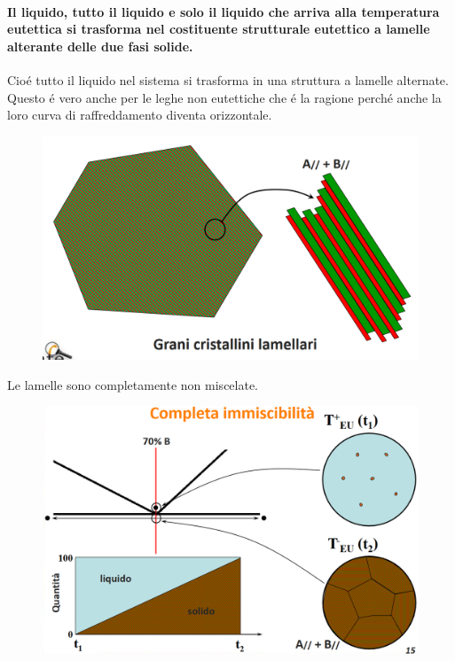 \documentclass{article}
\begin{document}
{            \paragraph{Il liquido, tutto il liquido e solo il liquido che arriva alla temperatura eutettica si trasforma nel costituente strutturale eutettico a lamelle alterante delle due fasi solide.}
            Cio\'e tutto il liquido nel sistema si trasforma in una struttura a lamelle alternate. Questo \'e vero anche per le leghe non eutettiche che \'e la ragione perch\'e anche la loro curva di raffreddamento diventa orizzontale.
            \begin{figure}[!h]
                \centering
                \includegraphics[width=.85\linewidth]{Struttura esemplare di grani cristallini lamellari, per un sistema di metalli completamente immiscibili.png}
            \end{figure}
            Le lamelle sono completamente non miscelate.
            \begin{figure}[!h]
                \centering
                \includegraphics[width=.85\linewidth]{Cambio di struttura prima e dopo la temperature eutettica in un sistema esemplare di metalli completamente immiscibili.png}

\end{figure}}
\end{document}
